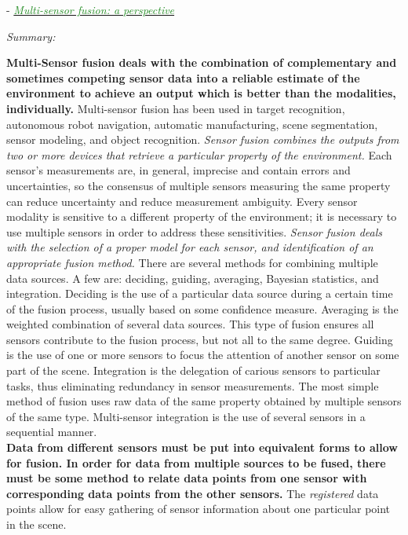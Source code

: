 \documentclass[]{article}
\newcommand{\paperentry}[4]{
            \hangindent=1cm
            \cite{#1} - \href{run:../References/#3}{\textcolor{ForestGreen}{\textit{#2}}}
            
            \noindent            
            \begin{minipage}[t]{0.1\linewidth}\hfill\end{minipage}
            \begin{minipage}[t]{0.8\linewidth}\textcolor{NavyBlue}{{\textit{Summary:}}}#4\end{minipage}
            \vspace{.25cm}
          }
\begin{document}
			
			\paperentry{hackett1990multisensorfusion}
			{Multi-sensor fusion: a perspective}
			{Fusion/Reviews/hackett1990multisensorfusion.pdf}
			{}\newline
			\textbf{Multi-Sensor fusion deals with the combination of complementary and sometimes competing sensor data into a reliable estimate of the environment to achieve an output which is better than the modalities, individually.}  Multi-sensor fusion has been used  in target recognition, autonomous robot navigation, automatic manufacturing, scene segmentation, sensor modeling, and object recognition.  \textit{Sensor fusion combines the outputs from two or more devices that retrieve a particular property of the environment.}  Each sensor's measurements are, in general, imprecise and contain errors and uncertainties, so the consensus of multiple sensors measuring the same property can reduce uncertainty and reduce measurement ambiguity. Every sensor modality is sensitive to a different property of the environment; it is necessary to use multiple sensors in order to address these sensitivities. \textit{Sensor fusion deals with the selection of a proper model  for each sensor, and identification of an appropriate fusion method.}  There are several methods for combining multiple data sources.  A few are: deciding, guiding, averaging, Bayesian statistics, and integration.  Deciding is the use of a particular data source during a certain time of the fusion process, usually based on some confidence measure.  Averaging is the weighted combination of several data sources. This type of fusion ensures all sensors contribute to the fusion process, but not all to the same degree.  Guiding is the use of one or more sensors to focus the attention of another sensor on some part of the scene.  Integration is the  delegation of carious sensors to particular tasks, thus eliminating redundancy in sensor measurements.  The most simple method of fusion uses raw data of the same property obtained by multiple sensors of the same type.  Multi-sensor integration is the use of several sensors in a sequential manner. \\
			\noindent
			\textbf{Data from different sensors must be put into equivalent forms to allow for fusion.  In order for data from multiple sources to be fused, there must be some method to relate data points from one sensor with corresponding data points from the other sensors.}  The \textit{registered} data points allow for easy gathering of sensor information about one particular point in the scene.  \\
\end{document}
